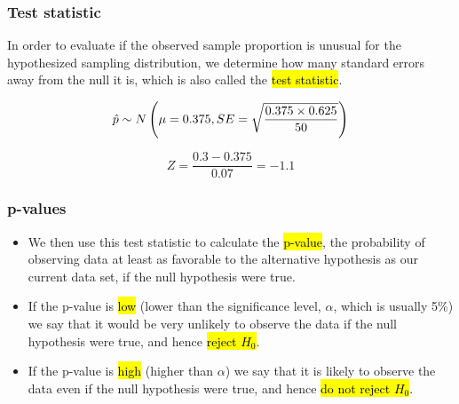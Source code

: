 \documentclass[notes,11pt, aspectratio=169]{beamer}
\begin{document}


 
\begin{frame}
\frametitle{Test statistic}
 
In order to evaluate if the observed sample proportion is unusual for the hypothesized sampling distribution, we determine how many standard errors away from the null it is, which is also called the \hl{test statistic}.
 
\pause
 
\[ \hat{p} \sim N \left(  \mu = 0.375, SE = \sqrt{\frac{0.375 \times 0.625}{50} }   \right) \]

\pause

\[ Z = \frac{0.3 - 0.375}{0.07} = -1.1 \]
 
 \pause
 
 
\pause
 
 
\end{frame}
 

\begin{frame}
\frametitle{p-values}

\begin{itemize}

\item We then use this test statistic to calculate the \hl{p-value}, the probability of observing data at least as favorable to the alternative hypothesis as our current data set, if the null hypothesis were true.

\pause

\item If the p-value is \hl{low} (lower than the significance level, $\alpha$, which is usually 5\%) we say that it would be very unlikely to observe the data if the null hypothesis were true, and hence \hl{reject $H_0$}.

\pause

\item If the p-value is \hl{high} (higher than $\alpha$) we say that it is likely to observe the data even if the null hypothesis were true, and hence \hl{do not reject $H_0$}.

\end{itemize}

\end{frame}
\end{document}
